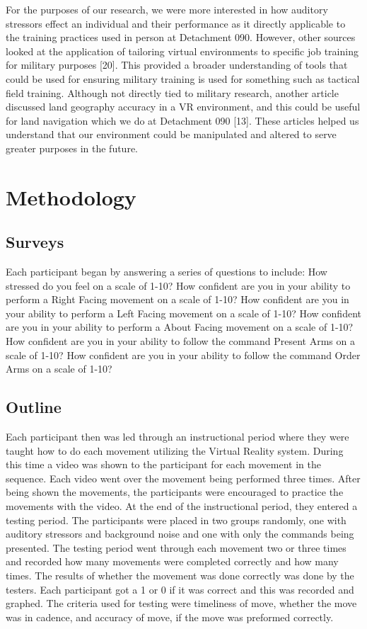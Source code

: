 \documentclass[manuscript,screen,review]{acmart}
\begin{document}
For the purposes of our research, we were more interested in how auditory stressors effect an individual 
and their performance as it directly applicable to the training practices used in person at Detachment 
090. However, other sources looked at the application of tailoring virtual environments to specific job 
training for military purposes [20]. This provided a broader understanding of tools that could be used 
for ensuring military training is used for something such as tactical field training. Although not directly 
tied to military research, another article discussed land geography accuracy in a VR environment, and 
this could be useful for land navigation which we do at Detachment 090 [13]. These articles helped us 
understand that our environment could be manipulated and altered to serve greater purposes in the future.   


\section{Methodology}
\subsection{Surveys}
Each participant began by answering a series of questions to include: How stressed do you feel on a scale 
of 1-10? How confident are you in your ability to perform a Right Facing movement on a scale of 1-10? How 
confident are you in your ability to perform a Left Facing movement on a scale of 1-10? How confident are 
you in your ability to perform a About Facing movement on a scale of 1-10? How confident are you in your 
ability to follow the command Present Arms on a scale of 1-10? How confident are you in your ability to 
follow the command Order Arms on a scale of 1-10? 

\subsection{Outline}
Each participant then was led through an instructional period where they were taught how to do each 
movement utilizing the Virtual Reality system. During this time a video was shown to the participant 
for each movement in the sequence. Each video went over the movement being performed three times. 
After being shown the movements, the participants were encouraged to practice the movements with the 
video. At the end of the instructional period, they entered a testing period. The participants were 
placed in two groups randomly, one with auditory stressors and background noise and one with only the 
commands being presented. The testing period went through each movement two or three times and recorded 
how many movements were completed correctly and how many times. The results of whether the movement was 
done correctly was done by the testers. Each participant got a 1 or 0 if it was correct and this was 
recorded and graphed. The criteria used for testing were timeliness of move, whether the move was in 
cadence, and accuracy of move, if the move was preformed correctly.  
\end{document}
